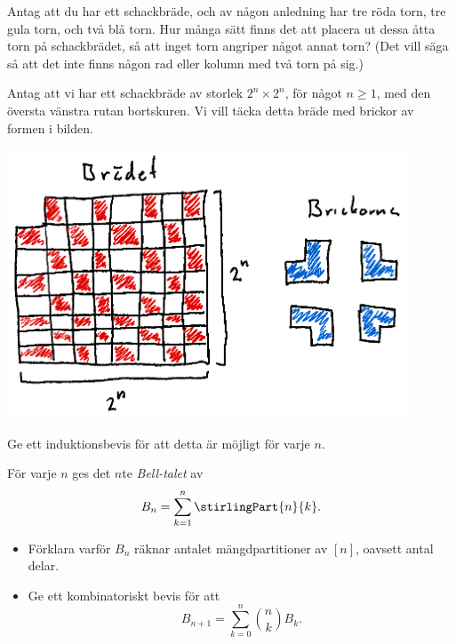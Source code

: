 \documentclass[nobib]{tufte-handout}
\begin{document}
\begin{xca}
  Antag att du har ett schackbräde, och av någon anledning har tre röda torn, tre gula torn, och två blå torn. Hur många sätt finns det att placera ut dessa åtta torn på schackbrädet, så att inget torn angriper något annat torn? (Det vill säga så att det inte finns någon rad eller kolumn med två torn på sig.)
\end{xca}


\begin{xca}
  Antag att vi har ett schackbräde av storlek $2^n \times 2^n$, för något $n\geq 1$, med den översta vänstra rutan bortskuren. Vi vill täcka detta bräde med brickor av formen i bilden.

  \includegraphics[width=0.9\textwidth]{graphics/chessboard_induction_extra_exercise.png}

  Ge ett induktionsbevis för att detta är möjligt för varje $n$.
\end{xca}

\begin{xca}
  För varje $n$ ges det $n$te \emph{Bell-talet} av
  $$B_n = \sum_{k=1}^{n} \stirlingPart{n}{k}.$$

  \begin{itemize}
    \item Förklara varför $B_n$ räknar antalet mängdpartitioner av $[n]$, oavsett antal delar.
    \item Ge ett kombinatoriskt bevis för att
    $$B_{n+1} = \sum_{k=0}^{n} \binom{n}{k} B_k.$$
  \end{itemize}
\end{xca}
%
%
\end{document}
